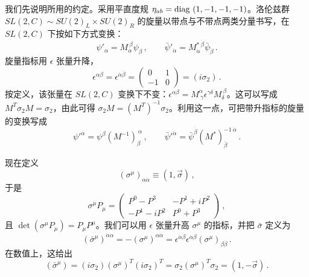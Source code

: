 我们先说明所用的约定。采用平直度规 $\eta_{ab} = {\rm diag}~ (1,-1,-1,-1)$。洛伦兹群 $SL(2, C)\sim SU(2)_L\times SU(2)_R$ 的旋量以带点与不带点两类分量书写，在 $SL(2,C)$ 下按如下方式变换：
$$
\psi'_\alpha = M_{\alpha}^{~\beta} \psi_\beta\,, \qquad
\bar\psi'_{\dot{\alpha}} = M^{*~\dot{\beta}}_{\dot{\alpha}}
\bar{\psi}_{\dot{\beta}}\,.
$$
旋量指标用 $\epsilon$ 张量升降，
$$
\epsilon^{\alpha \beta} = \epsilon^{\dot{\alpha}\dot{\beta}} =
\left( \begin{array}{lr}
0 & 1 \\
-1 & 0
\end{array} \right) =
(i \sigma_{2})\,.
$$
按定义，该张量在 $SL(2,C)$ 变换下不变：$\epsilon^{\alpha \beta} = M_{~\gamma}^{\alpha}
\epsilon^{\gamma \delta}M_{\delta}^{~\beta}$。这可以写成
$M^T\sigma_2 M=\sigma_2$，由此可得 $\sigma_2 M=(M^T)^{-1}\sigma_2$。利用这一点，可把带升指标的旋量的变换写成
$$
\psi'^\alpha =\psi^\beta (M^{-1})^{~\alpha}_{\beta}\,,\qquad
\bar{\psi}'^{\dot{\alpha}} = \bar{\psi}^{\dot{\beta}}
(M^*)^{-1~\dot{\alpha}}_{\dot{\beta}}\,.
$$


现在定义
$$
(\sigma^\mu)_{\alpha \dot{\alpha}} \equiv (1, \vec{\sigma})\,,
$$
于是
$$
\sigma^\mu P_\mu = \left ( \begin{array}{lr}
P^{0} - P^{3} & -P^{1} + i P^{2} \\
-P^{1} - iP^{2} & P^{0} + P^{3}
\end{array} \right )\,, 
$$
且 $\det(\sigma^\mu P_\mu)=P_\mu P^\mu$。我们可以用 $\epsilon$ 张量升高 $\sigma^\mu$ 的指标，并把 $\bar\sigma$ 定义为
$$
(\bar{\sigma}^\mu)^{\dot{\alpha}\alpha}=-(\sigma^\mu)^{\alpha\dot{\alpha}}
=\epsilon^{\dot{\alpha}\dot{\beta}}\epsilon^{\alpha \beta}
(\sigma^\mu)_{\beta \dot{\beta}}\,. 
$$
在数值上，这给出
$$
(\bar{\sigma}^\mu) = (i\sigma_2) (\sigma^\mu)^T (i\sigma_2)^T =
\sigma_2 (\sigma^\mu)^T\sigma_2 = (1, - \vec{\sigma})\,.
$$


